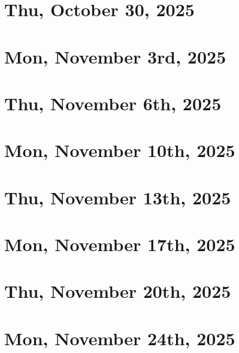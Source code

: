\documentclass[a4paper]{report}
\institute{Technion}
\date{Based on lectures by \profloc{} in 2025--26
\\ Notes created by Daniel Haim Breger
\\~\\ Draft updated on \today}
\begin{document}
\renewcommand\thepage{Title}
\maketitle
\renewcommand\thepage{Preface}


\newpage
\pagestyle{plain}
\tableofcontents
\newpage
\pagestyle{head}

\chapter{Thu, October 30, 2025}


\chapter{Mon, November 3rd, 2025}


\chapter{Thu, November 6th, 2025}


\chapter{Mon, November 10th, 2025}


\chapter{Thu, November 13th, 2025}


\chapter{Mon, November 17th, 2025}


\chapter{Thu, November 20th, 2025}


\chapter{Mon, November 24th, 2025}

\end{document}
